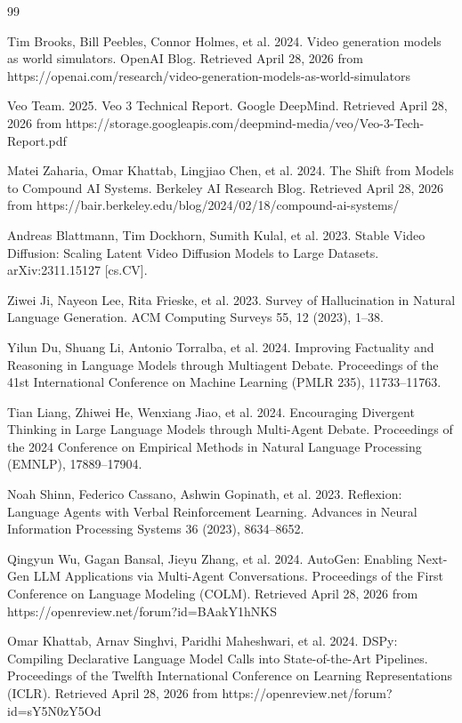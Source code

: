 \documentclass[sigconf]{acmart}
\begin{document}
\begin{thebibliography}{99}
\sloppy

Tim Brooks, Bill Peebles, Connor Holmes, et al. 2024. Video generation models as world simulators. OpenAI Blog. Retrieved April 28, 2026 from https://openai.com/research/video-generation-models-as-world-simulators

Veo Team. 2025. Veo 3 Technical Report. Google DeepMind. Retrieved April 28, 2026 from https://storage.googleapis.com/deepmind-media/veo/Veo-3-Tech-Report.pdf

Matei Zaharia, Omar Khattab, Lingjiao Chen, et al. 2024. The Shift from Models to Compound AI Systems. Berkeley AI Research Blog. Retrieved April 28, 2026 from https://bair.berkeley.edu/blog/2024/02/18/compound-ai-systems/

Andreas Blattmann, Tim Dockhorn, Sumith Kulal, et al. 2023. Stable Video Diffusion: Scaling Latent Video Diffusion Models to Large Datasets. arXiv:2311.15127 [cs.CV].

Ziwei Ji, Nayeon Lee, Rita Frieske, et al. 2023. Survey of Hallucination in Natural Language Generation. ACM Computing Surveys 55, 12 (2023), 1--38.

Yilun Du, Shuang Li, Antonio Torralba, et al. 2024. Improving Factuality and Reasoning in Language Models through Multiagent Debate. Proceedings of the 41st International Conference on Machine Learning (PMLR 235), 11733--11763.

Tian Liang, Zhiwei He, Wenxiang Jiao, et al. 2024. Encouraging Divergent Thinking in Large Language Models through Multi-Agent Debate. Proceedings of the 2024 Conference on Empirical Methods in Natural Language Processing (EMNLP), 17889--17904.

Noah Shinn, Federico Cassano, Ashwin Gopinath, et al. 2023. Reflexion: Language Agents with Verbal Reinforcement Learning. Advances in Neural Information Processing Systems 36 (2023), 8634--8652.

Qingyun Wu, Gagan Bansal, Jieyu Zhang, et al. 2024. AutoGen: Enabling Next-Gen LLM Applications via Multi-Agent Conversations. Proceedings of the First Conference on Language Modeling (COLM). Retrieved April 28, 2026 from https://openreview.net/forum?id=BAakY1hNKS

Omar Khattab, Arnav Singhvi, Paridhi Maheshwari, et al. 2024. DSPy: Compiling Declarative Language Model Calls into State-of-the-Art Pipelines. Proceedings of the Twelfth International Conference on Learning Representations (ICLR). Retrieved April 28, 2026 from https://openreview.net/forum?id=sY5N0zY5Od


\end{thebibliography}
\end{document}
